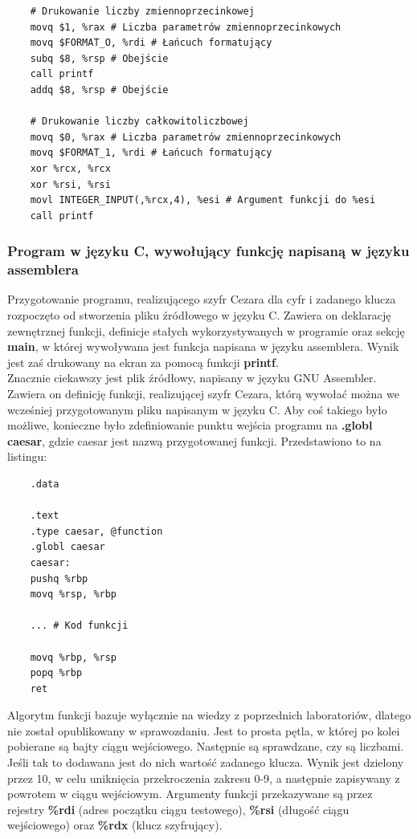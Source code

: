 \documentclass[a4paper,12pt]{article}
\begin{document}
\begin{verbatim}
	# Drukowanie liczby zmiennoprzecinkowej
	movq $1, %rax # Liczba parametrów zmiennoprzecinkowych
	movq $FORMAT_O, %rdi # Łańcuch formatujący
	subq $8, %rsp # Obejście
	call printf
	addq $8, %rsp # Obejście
	
	# Drukowanie liczby całkowitoliczbowej
	movq $0, %rax # Liczba parametrów zmiennoprzecinkowych
	movq $FORMAT_1, %rdi # Łańcuch formatujący
	xor %rcx, %rcx
	xor %rsi, %rsi
	movl INTEGER_INPUT(,%rcx,4), %esi # Argument funkcji do %esi
	call printf
\end{verbatim}
\newpage
\subsubsection{Program w języku C, wywołujący funkcję napisaną w języku assemblera}
Przygotowanie programu, realizującego szyfr Cezara dla cyfr i zadanego klucza rozpoczęto od stworzenia pliku źródłowego w języku C. Zawiera on deklarację zewnętrznej funkcji, definicje stałych wykorzystywanych w programie oraz sekcję \textbf{main}, w której wywoływana jest funkcja napisana w języku assemblera. Wynik jest zaś drukowany na ekran za pomocą funkcji \textbf{printf}.\\
Znacznie ciekawszy jest plik źródłowy, napisany w języku GNU Assembler. Zawiera on definicję funkcji, realizującej szyfr Cezara, którą wywołać można we wcześniej przygotowanym pliku napisanym w języku C. Aby coś takiego było możliwe, konieczne było zdefiniowanie punktu wejścia programu na \textbf{.globl caesar}, gdzie caesar jest nazwą przygotowanej funkcji. Przedstawiono to na listingu:
\begin{verbatim}
	.data
	
	.text
	.type caesar, @function
	.globl caesar
	caesar:
	pushq %rbp
	movq %rsp, %rbp
	
	... # Kod funkcji
	
	movq %rbp, %rsp
	popq %rbp
	ret
\end{verbatim}
Algorytm funkcji bazuje wyłącznie na wiedzy z poprzednich laboratoriów, dlatego nie został opublikowany w sprawozdaniu. Jest to prosta pętla, w której po kolei pobierane są bajty ciągu wejściowego. Następnie są sprawdzane, czy są liczbami. Jeśli tak to dodawana jest do nich wartość zadanego klucza. Wynik jest dzielony przez 10, w celu uniknięcia przekroczenia zakresu 0-9, a następnie zapisywany z powrotem w ciągu wejściowym. Argumenty funkcji przekazywane są przez rejestry \textbf{\%rdi} (adres początku ciągu testowego), \textbf{\%rsi} (długość ciągu wejściowego) oraz \textbf{\%rdx} (klucz szyfrujący).
\end{document}
